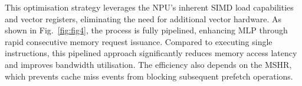 This optimisation strategy leverages the NPU's inherent SIMD load capabilities and vector registers, eliminating the need for additional vector hardware. 
As shown in Fig.~\ref{fig:fig4}, the process is fully pipelined, enhancing MLP through rapid consecutive memory request issuance.
Compared to executing single instructions, this pipelined approach significantly reduces memory access latency and improves bandwidth utilisation. 
The efficiency also depends on the MSHR, which prevents cache miss events from blocking subsequent prefetch operations.










